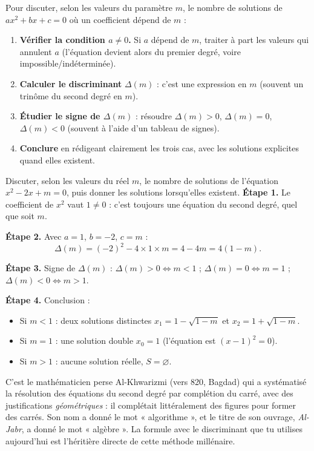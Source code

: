 \documentclass[11pt]{article}
\begin{document}
\begin{methode}
Pour discuter, selon les valeurs du paramètre $m$, le nombre de solutions de $ax^2+bx+c=0$ où un coefficient dépend de $m$ :
\begin{enumerate}
\item \textbf{Vérifier la condition $a\neq 0$.} Si $a$ dépend de $m$, traiter à part les valeurs qui annulent $a$ (l'équation devient alors du premier degré, voire impossible/indéterminée).
\item \textbf{Calculer le discriminant} $\Delta(m)$ : c'est une expression en $m$ (souvent un trinôme du second degré en $m$).
\item \textbf{Étudier le signe de $\Delta(m)$} : résoudre $\Delta(m)>0$, $\Delta(m)=0$, $\Delta(m)<0$ (souvent à l'aide d'un tableau de signes).
\item \textbf{Conclure} en rédigeant clairement les trois cas, avec les solutions explicites quand elles existent.
\end{enumerate}
\end{methode}

\begin{exoresolu}[Discussion selon $m$ de $x^2-2x+m=0$]
Discuter, selon les valeurs du réel $m$, le nombre de solutions de l'équation $x^2-2x+m=0$, puis donner les solutions lorsqu'elles existent.
\tcblower
\textbf{Étape 1.} Le coefficient de $x^2$ vaut $1\neq 0$ : c'est toujours une équation du second degré, quel que soit $m$.

\textbf{Étape 2.} Avec $a=1$, $b=-2$, $c=m$ :
\[ \Delta(m)=(-2)^2-4\times 1\times m=4-4m=4(1-m). \]

\textbf{Étape 3.} Signe de $\Delta(m)$ : $\Delta(m)>0 \iff m<1$ ; $\Delta(m)=0 \iff m=1$ ; $\Delta(m)<0 \iff m>1$.

\textbf{Étape 4.} Conclusion :
\begin{itemize}
\item Si $m<1$ : deux solutions distinctes $x_1=1-\sqrt{1-m}$ et $x_2=1+\sqrt{1-m}$.
\item Si $m=1$ : une solution double $x_0=1$ (l'équation est $(x-1)^2=0$).
\item Si $m>1$ : aucune solution réelle, $S=\varnothing$.
\end{itemize}
\end{exoresolu}

\begin{savaistu}
C'est le mathématicien perse Al-Khwarizmi (vers 820, Bagdad) qui a systématisé la résolution des équations du second degré par complétion du carré, avec des justifications \emph{géométriques} : il complétait littéralement des figures pour former des carrés. Son nom a donné le mot « algorithme », et le titre de son ouvrage, \emph{Al-Jabr}, a donné le mot « algèbre ». La formule avec le discriminant que tu utilises aujourd'hui est l'héritière directe de cette méthode millénaire.
\end{savaistu}
\end{document}
